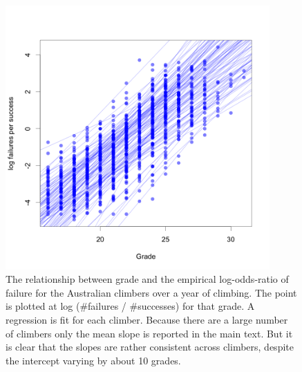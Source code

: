 \documentclass[11pt]{article}
\begin{document}
\begin{figure}
\centering
\includegraphics[width=0.9\textwidth]{../results/aus/ascents-from-2016-08-01-to-2021-08-01-minAscents400-minFails1-session-regression.png}
\caption{\small The relationship between grade and the empirical log-odds-ratio of failure for the Australian climbers over a year of climbing. The point is plotted at log (\#failures / \#successes) for that grade. A regression is fit for each climber. Because there are a large number of climbers only the mean slope is reported in the main text. But it is clear that the slopes are rather consistent across climbers, despite the intercept varying by about 10 grades.}
\label{fig1}
\end{figure}
\end{document}
